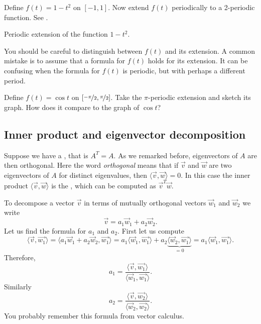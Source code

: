 \documentclass{ximera}
\begin{document}
\begin{example}
    Define $f(t) = 1-t^2$ on $[-1,1]$.  Now extend $f(t)$ periodically to a 2-periodic function.  See .
    \begin{myfig}
        \capstart
        \caption{Periodic extension of the function $1-t^2$.\label{ts:perextofinvertedparabolafig}}
    \end{myfig}
\end{example}

You should be careful to distinguish between $f(t)$ and its extension.  A common mistake is to assume that a formula for $f(t)$ holds for its extension.  It can be confusing when the formula for $f(t)$ is periodic, but with perhaps a different period.

\begin{exercise}
    Define $f(t) = \cos t$ on $[\nicefrac{-\pi}{2},\nicefrac{\pi}{2}]$.  Take the $\pi$-periodic extension and sketch its graph.  How does it compare to the graph of $\cos t$?
\end{exercise}

\subsection{Inner product and eigenvector decomposition}

Suppose we have a \emph{}, that is $A^T = A$.  As we remarked before, eigenvectors of $A$ are then orthogonal.  Here the word \emph{orthogonal} means that if $\vec{v}$ and $\vec{w}$ are two eigenvectors of $A$ for distinct eigenvalues, then $\langle \vec{v} , \vec{w} \rangle = 0$. In this case the inner product $\langle \vec{v} , \vec{w} \rangle$ is the \emph{}, which can be computed as $\vec{v}^T\vec{w}$.

To decompose a vector $\vec{v}$ in terms of mutually orthogonal vectors $\vec{w}_1$ and $\vec{w}_2$ we write
\begin{equation*}
    \vec{v} = a_1 \vec{w}_1  + a_2 \vec{w}_2 .
\end{equation*}
Let us find the formula for $a_1$ and $a_2$.  First let us compute
\begin{equation*}
    \langle \vec{v} , \vec{w_1} \rangle
    = \langle a_1 \vec{w}_1  + a_2 \vec{w}_2 , \vec{w_1} \rangle = a_1 \langle \vec{w}_1 , \vec{w_1} \rangle
    + a_2 \underbrace{\langle \vec{w}_2 , \vec{w_1} \rangle}_{=0} = a_1 \langle \vec{w}_1 , \vec{w_1} \rangle .
\end{equation*}
Therefore,
\begin{equation*}
    a_1 = \frac{\langle \vec{v} , \vec{w_1} \rangle}{\langle \vec{w}_1 , \vec{w_1} \rangle} .
\end{equation*}
Similarly
\begin{equation*}
    a_2 = \frac{\langle \vec{v} , \vec{w_2} \rangle}{\langle \vec{w}_2 , \vec{w_2} \rangle} .
\end{equation*}
You probably remember this formula from vector calculus.
\end{document}
